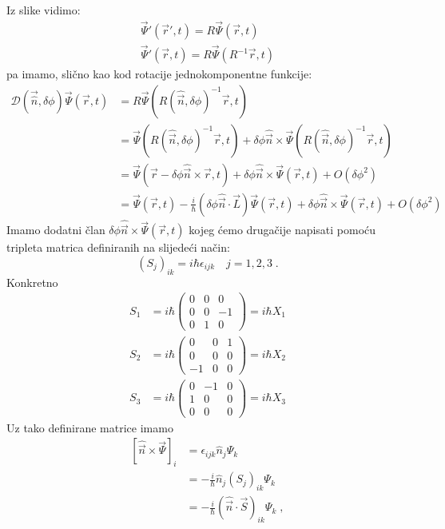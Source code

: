 Iz slike vidimo:
\begin{gather*}
\vec{\Psi}'(\vec{r}',t)=R \vec{\Psi}(\vec{r},t) \\
\vec{\Psi}'(\vec{r},t)=R \vec{\Psi}(R^{-1}\vec{r},t) 
\end{gather*}
pa imamo, slično kao kod rotacije jednokomponentne funkcije:
\begin{equation*}
\begin{split}
\mathcal{D}(\vec{\hat{n}},\delta\phi)\vec{\Psi}(\vec{r}, t)&=
 R \vec{\Psi}(R(\hat{\vec{n}},\delta \phi)^{-1}
\vec{r}, t) \\
 &=\vec{\Psi}(R(\hat{\vec{n}}, \delta\phi)^{-1}\vec{r}, t)+
\delta\phi \hat{\vec{n}}\times\vec{\Psi}(
R(\hat{\vec{n}}, \delta\phi)^{-1}\vec{r},t) \\
 &=\vec{\Psi}(\vec{r}-\delta\phi\hat{\vec{n}}\times\vec{r}, t)+
\delta\phi \hat{\vec{n}}\times\vec{\Psi}(\vec{r},t) + O(\delta\phi^2) \\
 &= \vec{\Psi}(\vec{r}, t)-\frac{i}{\hbar}(\delta\phi\hat{\vec{n}}\cdot
  \vec{L})\vec{\Psi}(\vec{r}, t)+
\delta\phi \hat{\vec{n}}\times\vec{\Psi}(\vec{r},t) + O(\delta\phi^2)
\end{split}
\end{equation*}
Imamo dodatni član $\delta\phi \hat{\vec{n}}\times\vec{\Psi}(\vec{r},t)$
kojeg ćemo drugačije napisati pomoću tripleta matrica definiranih na
slijedeći način:
\begin{displaymath}
(S_j)_{ik} = i\hbar\epsilon_{ijk} \quad j=1,2,3 \;.
\end{displaymath}
Konkretno
\begin{align}
S_1& =i\hbar
\begin{pmatrix}
0 & 0 & 0 \\
0 & 0 &-1 \\
0 & 1 & 0
\end{pmatrix} = i\hbar X_1 \\
S_2& = i\hbar
\begin{pmatrix}
0 & 0 & 1 \\
0 & 0 & 0 \\
-1 & 0 & 0
\end{pmatrix} = i\hbar X_2 \\
S_3& = i\hbar
\begin{pmatrix}
0 & -1 & 0 \\
1 & 0 & 0\\
0 & 0 & 0
\end{pmatrix} = i\hbar X_3 
\end{align}
Uz tako definirane matrice imamo
\begin{displaymath}
\begin{split}
[\hat{\vec{n}}\times\vec{\Psi}]_i &=
\epsilon_{ijk}\hat{n}_j\Psi_k \\
&= -\frac{i}{\hbar}\hat{n}_j (S_j)_{ik}\Psi_k\\
&= -\frac{i}{\hbar}(\hat{\vec{n}}\cdot\vec{S})_{ik}\Psi_k \;,
\end{split}
\end{displaymath}

